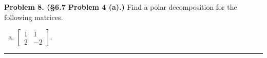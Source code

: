 \documentclass[leqno]{article}
\theoremstyle{nonumberplain}
\begin{document}
\pagebreak





\noindent\textbf{Problem 8. (\S 6.7 Problem 4 (a).)} Find a polar decomposition for the following matrices.
\begin{enumerate}[(a)]
\item $\begin{bmatrix}
1 & 1\\
2 & -2
\end{bmatrix}.$

\end{enumerate}

\noindent\rule[0.5ex]{\linewidth}{1pt}
\end{document}
